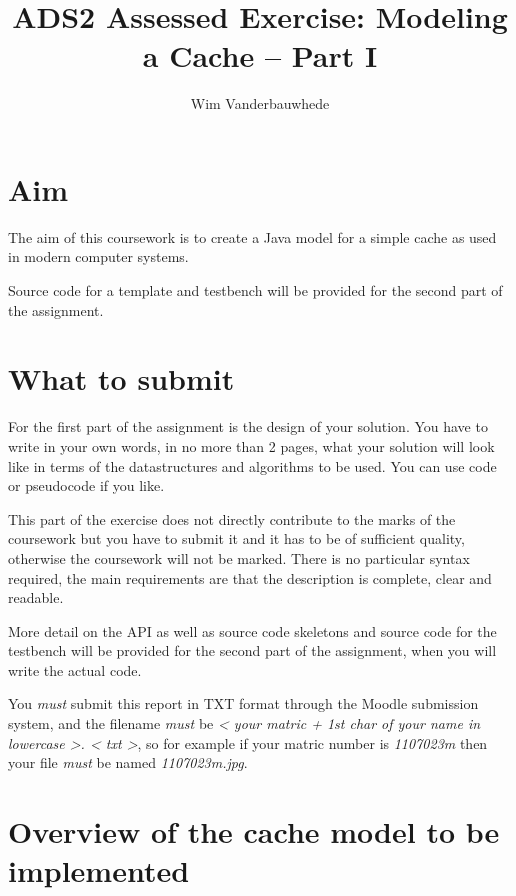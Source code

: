 \documentclass[11pt]{article}
\title{ADS2 Assessed Exercise: Modeling a Cache -- Part I}
\author{Wim Vanderbauwhede}
\date{\vspace{-5ex}}                                           %
\begin{document}
\maketitle


\section{Aim}\label{aim}

The aim of this coursework is to create a Java model for a simple cache as used in modern computer systems.

Source code for a template and  testbench will be provided for the second part of the assignment.

\section{What to submit}\label{what-to-submit}

For the first part of the assignment is the design of your solution. You have to write in your own words, in no more than 2 pages, what your solution will look like in terms of the datastructures and algorithms to be used. You can use code or pseudocode if you like.
 
This part of the exercise does not directly contribute to the marks of the coursework but you have to submit it and it has to be of sufficient quality, otherwise the coursework will not be marked. There is no particular syntax required, the main requirements are that the description is complete, clear and readable. 

More detail on the API as well as source code skeletons and source code for the testbench will be provided for the second part of the assignment, when you will write the actual code.

You \emph{must} submit this report  in TXT format through the
Moodle submission system, and the filename \emph{must} be
\emph{\textless{} your matric + 1st char of your name in lowercase
\textgreater{}. \textless{} txt \textgreater{}}, so for example
if your matric number is \emph{1107023m} then your file \emph{must} be
named \emph{1107023m.jpg}.

\section{Overview of the cache model to be implemented}\label{overview-of-the-cache}
\end{document}
